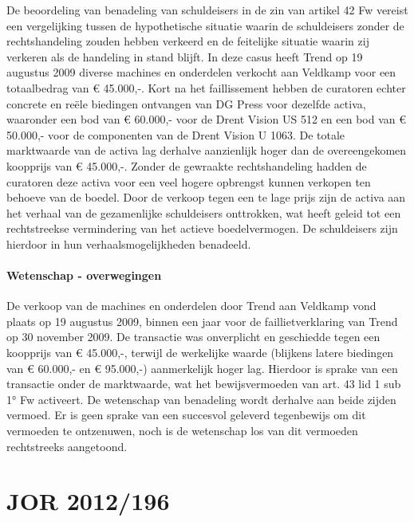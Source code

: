 \documentclass[
  dutch,
  a4paper,
]{article}
\begin{document}
De beoordeling van benadeling van schuldeisers in de zin van artikel 42 Fw vereist een vergelijking tussen de hypothetische situatie waarin de schuldeisers zonder de rechtshandeling zouden hebben verkeerd en de feitelijke situatie waarin zij verkeren als de handeling in stand blijft. In deze casus heeft Trend op 19 augustus 2009 diverse machines en onderdelen verkocht aan Veldkamp voor een totaalbedrag van € 45.000,-. Kort na het faillissement hebben de curatoren echter concrete en reële biedingen ontvangen van DG Press voor dezelfde activa, waaronder een bod van € 60.000,- voor de Drent Vision US 512 en een bod van € 50.000,- voor de componenten van de Drent Vision U 1063. De totale marktwaarde van de activa lag derhalve aanzienlijk hoger dan de overeengekomen koopprijs van € 45.000,-. Zonder de gewraakte rechtshandeling hadden de curatoren deze activa voor een veel hogere opbrengst kunnen verkopen ten behoeve van de boedel. Door de verkoop tegen een te lage prijs zijn de activa aan het verhaal van de gezamenlijke schuldeisers onttrokken, wat heeft geleid tot een rechtstreekse vermindering van het actieve boedelvermogen. De schuldeisers zijn hierdoor in hun verhaalsmogelijkheden benadeeld.

\paragraph{Wetenschap - overwegingen}\label{wetenschap---overwegingen-71}

De verkoop van de machines en onderdelen door Trend aan Veldkamp vond plaats op 19 augustus 2009, binnen een jaar voor de faillietverklaring van Trend op 30 november 2009. De transactie was onverplicht en geschiedde tegen een koopprijs van € 45.000,-, terwijl de werkelijke waarde (blijkens latere biedingen van € 60.000,- en € 95.000,-) aanmerkelijk hoger lag. Hierdoor is sprake van een transactie onder de marktwaarde, wat het bewijsvermoeden van art. 43 lid 1 sub 1° Fw activeert. De wetenschap van benadeling wordt derhalve aan beide zijden vermoed. Er is geen sprake van een succesvol geleverd tegenbewijs om dit vermoeden te ontzenuwen, noch is de wetenschap los van dit vermoeden rechtstreeks aangetoond.

\newpage


\section{JOR 2012/196}\label{jor-2012196}
\end{document}
